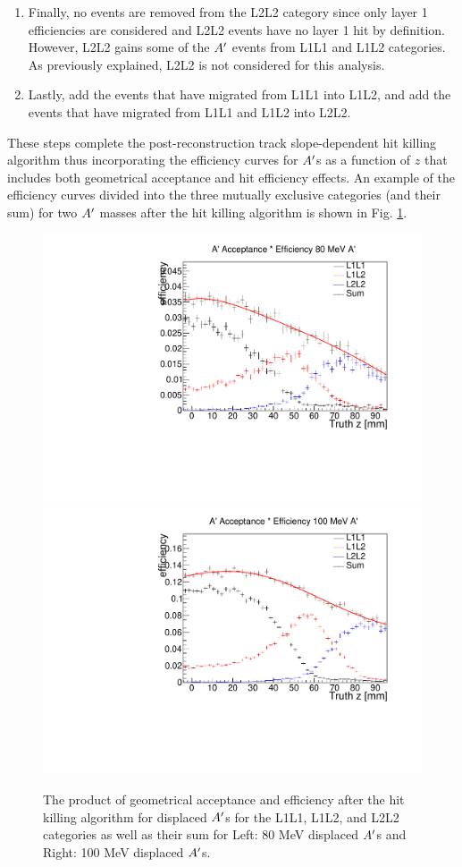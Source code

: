 \begin{enumerate}
\begin{enumerate}
  \end{enumerate}
  \item Finally, no events are removed from the L2L2 category since only layer 1 efficiencies are considered and L2L2 events have no layer 1 hit by definition. However, L2L2 gains some of the $A^\prime$ events from L1L1 and L1L2 categories. As previously explained, L2L2 is not considered for this analysis.
  \item Lastly, add the events that have migrated from L1L1 into L1L2, and add the events that have migrated from L1L1 and L1L2 into L2L2.
\end{enumerate}

These steps complete the post-reconstruction track slope-dependent hit killing algorithm thus incorporating the efficiency curves for $A^\prime$s as a function of $z$ that includes both geometrical acceptance and hit efficiency effects. An example of the efficiency curves divided into the three mutually exclusive categories (and their sum) for two $A^\prime$ masses after the hit killing algorithm is shown in Fig. \ref{fig:eff1}.

\begin{figure}[t]
    \centering
    \includegraphics[width=.45\textwidth]{figs/selection/ap_80MeV_eff_fit.pdf}
    \includegraphics[width=.45\textwidth]{figs/selection/ap_100MeV_eff_fit.pdf}
    \caption{The product of geometrical acceptance and efficiency after the hit killing algorithm for displaced $A^\prime$s for the L1L1, L1L2, and L2L2 categories as well as their sum for Left: 80 MeV displaced $A^\prime$s and Right: 100 MeV displaced $A^\prime$s. %
    }
    \label{fig:eff1}
\end{figure}

